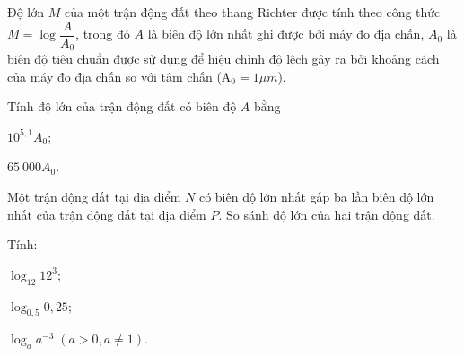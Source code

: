 \begin{bt}%
	Độ lớn $ M $ của một trận động đất theo thang Richter được tính theo công thức $ M=\log \dfrac{A}{A_0} $, trong đó $ A $ là biên độ lớn nhất ghi được bởi máy đo địa chấn, $ A_0 $ là biên độ tiêu chuẩn được sử dụng để hiệu chỉnh độ lệch gây ra bởi khoảng cách của máy đo địa chấn so với tâm chấn ($ \mathrm{A}_0=1 \mu m$).
	\begin{listEX}[1]
		\item[a)] Tính độ lớn của trận động đất có biên độ $A$ bằng
		\begin{listEX}[2]
			\item[i)] $ 10^{5{,}1}A_0 $;
			\item[ii)] $ 65~000 A_0$.  
		\end{listEX}
		\item[b)] Một trận động đất tại địa điểm $ N $ có biên độ lớn nhất gấp ba lần biên độ lớn nhất của trận động đất tại địa điểm $ P $. So sánh độ lớn của hai trận động đất.
	\end{listEX}
\end{bt}

\begin{bt}%
 
	Tính:
	\begin{listEX}[3] 
		\item  $\log _{12} 12^{3}$;
		\item $\log _{0,5} 0{,}25$;
		\item $\log _{a} a^{-3} \;(a>0, a \neq 1)$.
	\end{listEX}
\end{bt}

